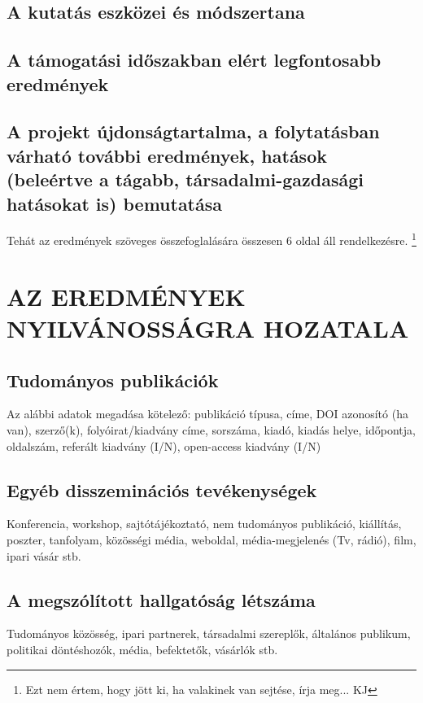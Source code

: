 \documentclass[graybox,envcountchap,sectrefs]{svmono}
\begin{document}
\subsection{A kutatás eszközei és módszertana}

\subsection{A támogatási időszakban elért legfontosabb eredmények}

\subsection{A projekt újdonságtartalma, a folytatásban várható további eredmények, hatások (beleértve a tágabb, társadalmi-gazdasági hatásokat is) bemutatása}

Tehát az eredmények szöveges összefoglalására összesen 6 oldal áll rendelkezésre. \footnote{Ezt nem értem, hogy jött ki, ha valakinek van sejtése, írja meg... KJ}

\section{AZ EREDMÉNYEK NYILVÁNOSSÁGRA HOZATALA}

\subsection{Tudományos publikációk}

Az alábbi adatok megadása kötelező: publikáció típusa, címe, DOI azonosító (ha van), szerző(k), folyóirat/kiadvány címe, sorszáma, kiadó, kiadás helye, időpontja, oldalszám, referált kiadvány (I/N), open-access kiadvány (I/N)

\subsection{Egyéb disszeminációs tevékenységek}

Konferencia, workshop, sajtótájékoztató, nem tudományos publikáció, kiállítás, poszter, tanfolyam, közösségi média, weboldal, média-megjelenés (Tv, rádió), film, ipari vásár stb.

\subsection{A megszólított hallgatóság létszáma}

Tudományos közösség, ipari partnerek, társadalmi szereplők, általános publikum, politikai döntéshozók, média, befektetők, vásárlók stb.
\end{document}
